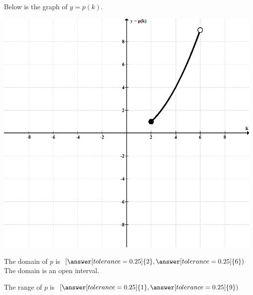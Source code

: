 \documentclass{ximera}
\author{Lee Wayand}
\begin{document}
\begin{exercise}  





Below is the graph of $y=p(k)$.  

\begin{image}
\includegraphics{../../pics/func_graphs/f1.png}
\end{image}









\begin{question} 


The domain of $p$ is  $\left[ \answer[tolerance=0.25]{2}, \answer[tolerance=0.25]{6} \right)$  \\


The domain is an open interval.
\begin{multipleChoice}
\end{multipleChoice}

\end{question}






\begin{question} 


The range of $p$ is $\left[ \answer[tolerance=0.25]{1}, \answer[tolerance=0.25]{9} \right)$ \\



\end{question}
\end{exercise}
\end{document}
